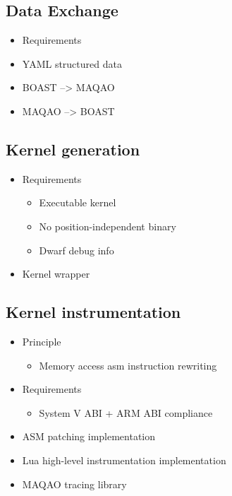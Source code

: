 \documentclass[11pt, a4paper, twoside]{montblanc2}
\begin{document}
\subsection{Data Exchange}

\begin{itemize}
  \item Requirements
  \item YAML structured data
  \item BOAST --> MAQAO
  \item MAQAO --> BOAST
\end{itemize}

\subsection{Kernel generation}

\begin{itemize}
  \item Requirements
    \begin{itemize}
      \item Executable kernel
      \item No position-independent binary
      \item Dwarf debug info
    \end{itemize}
  \item Kernel wrapper
\end{itemize}

\subsection{Kernel instrumentation}

\begin{itemize}
  \item Principle
    \begin{itemize}
      \item Memory access asm instruction rewriting
    \end{itemize}
  \item Requirements
    \begin{itemize}
      \item System V ABI + ARM ABI compliance
    \end{itemize}
  \item ASM patching implementation
  \item Lua high-level instrumentation implementation
  \item MAQAO tracing library
\end{itemize}
\end{document}
